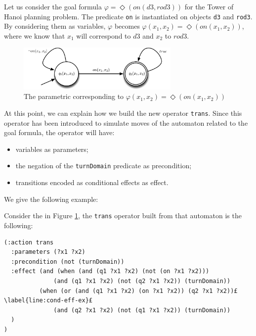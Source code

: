 \begin{example}\label{ex:param-formula}
Let us consider the goal formula $\varphi = \Diamond(on(d3,rod3))$ for the Tower of Hanoi planning problem. The predicate \texttt{on} is instantiated on objects \texttt{d3} and \texttt{rod3}. By considering them as variables, $\varphi$ becomes $\varphi(x_1,x_2) = \Diamond(on(x_1,x_2))$, where we know that $x_1$ will correspond to $d3$ and $x_2$ to $rod3$. 
\begin{figure}[h]
\centering
\includegraphics[width=0.7\textwidth]{images/automa-param}
\caption{The parametric \DFA corresponding to $\varphi(x_1,x_2) = \Diamond(on(x_1,x_2))$} 
\label{fig:dfa-parametric}
\end{figure}
\end{example}

At this point, we can explain how we build the new operator \texttt{trans}. Since this operator has been introduced to simulate moves of the automaton related to the goal formula, the operator will have:
\begin{itemize}
\item variables as parameters;
\item the negation of the \texttt{turnDomain} predicate as precondition;
\item transitions encoded as conditional effects as effect.
\end{itemize}
We give the following example:

\begin{example}\label{ex:trans-op-adl}
Consider the \DFA in Figure \ref{fig:dfa-parametric}, the \texttt{trans} operator built from that automaton is the following:
\begin{lstlisting}[language=PDDL, escapechar=£]
(:action trans
  :parameters (?x1 ?x2)
  :precondition (not (turnDomain))
  :effect (and (when (and (q1 ?x1 ?x2) (not (on ?x1 ?x2)))
              (and (q1 ?x1 ?x2) (not (q2 ?x1 ?x2)) (turnDomain))
          (when (or (and (q1 ?x1 ?x2) (on ?x1 ?x2)) (q2 ?x1 ?x2))£\label{line:cond-eff-ex}£
              (and (q2 ?x1 ?x2) (not (q1 ?x1 ?x2)) (turnDomain))
  )
)
\end{lstlisting}
\end{example}

